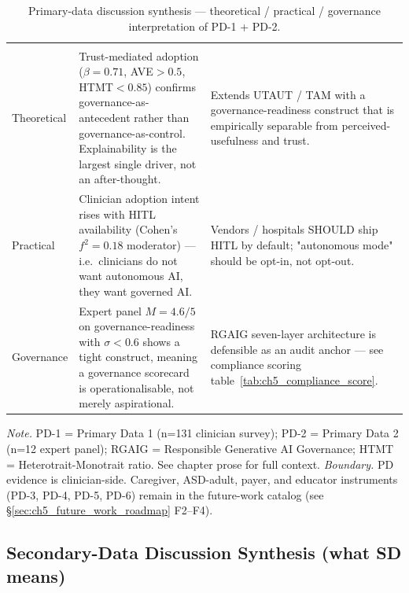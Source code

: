 {\tablestripes\tablefontsize
\begin{xltabular}{\textwidth}{@{} >{\raggedright\arraybackslash}p{2.4cm} L L @{}}
\caption[Primary-Data Discussion Synthesis]{Primary-data discussion synthesis --- theoretical / practical / governance interpretation of PD-1 + PD-2.}\label{tab:ch5_primary_discussion_synthesis} \\
\toprule
{} &  &  \\
\midrule
\endfirsthead
\toprule
{} &  &  \\
\midrule
\endhead
\bottomrule
\endlastfoot
Theoretical & Trust-mediated adoption ($\beta{=}0.71$, AVE${>}0.5$, HTMT${<}0.85$) confirms governance-as-antecedent rather than governance-as-control. Explainability is the largest single driver, not an after-thought. & Extends UTAUT / TAM with a governance-readiness construct that is empirically separable from perceived-usefulness and trust. \\
Practical & Clinician adoption intent rises with HITL availability (Cohen's $f^2{=}0.18$ moderator) — i.e.\ clinicians do not want autonomous AI, they want governed AI. & Vendors / hospitals SHOULD ship HITL by default; "autonomous mode" should be opt-in, not opt-out. \\
Governance & Expert panel $M{=}4.6/5$ on governance-readiness with $\sigma{<}0.6$ shows a tight construct, meaning a governance scorecard is operationalisable, not merely aspirational. & RGAIG seven-layer architecture is defensible as an audit anchor — see compliance scoring table~\ref{tab:ch5_compliance_score}. \\
\end{xltabular}}
\vspace{0.3em}\noindent\textit{Note.} PD-1 = Primary Data 1 (n=131 clinician survey); PD-2 = Primary Data 2 (n=12 expert panel); RGAIG = Responsible Generative AI Governance; HTMT = Heterotrait-Monotrait ratio. See chapter prose for full context.
\vspace{0.5em}\noindent\textit{Boundary.} PD evidence is clinician-side. Caregiver, ASD-adult, payer, and educator instruments (PD-3, PD-4, PD-5, PD-6) remain in the future-work catalog (see §\ref{sec:ch5_future_work_roadmap} F2--F4).

\subsection{Secondary-Data Discussion Synthesis (what SD means)}
\label{sec:ch5_secondary_discussion_synthesis}

